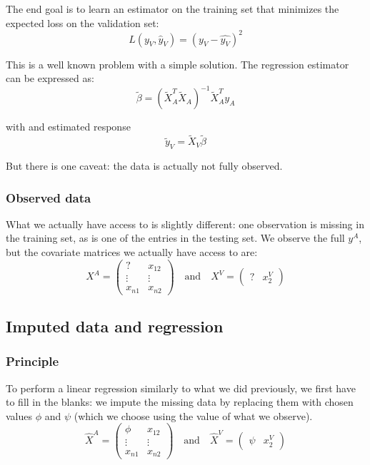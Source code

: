 \documentclass[12pt, a4paper]{memoir}
\begin{document}
The end goal is to learn an estimator on the training set that minimizes the expected loss on the validation set:
$$
L(y_V, \hat{y}_V) = (y_V - \hat{y_V})^2
$$

This is a well known problem with a simple solution. The regression estimator can be expressed as:
$$ \tilde{\beta} = (\tilde{X}_A^T \tilde{X}_A)^{-1} \tilde{X}_A^T y_A $$

with and estimated response
$$ \tilde{y}_V = \tilde{X}_V \tilde{\beta} $$

But there is one caveat: the data is actually not fully observed.

			\subsubsection{Observed data}
What we actually have access to is slightly different: one observation is missing in the training set, as is one of the entries in the testing set. We observe the full $y^A$, but the covariate matrices we actually have access to are:
\begin{equation*}
X^A = 
\begin{pmatrix}
? & x_{12} \\
\vdots & \vdots \\
x_{n1} & x_{n2}
\end{pmatrix}
\quad \mathrm{and} \quad
X^V = 
\begin{pmatrix}
? & x_{2}^V
\end{pmatrix}
\end{equation*}

		\subsection{Imputed data and regression}
			\subsubsection{Principle}
To perform a linear regression similarly to what we did previously, we first have to fill in the blanks: we impute the missing data by replacing them with chosen values $\phi$ and $\psi$ (which we choose using the value of what we observe).
\begin{equation*}
\hat{X}^A = 
\begin{pmatrix}
\phi & x_{12} \\
\vdots & \vdots \\
x_{n1} & x_{n2}
\end{pmatrix}
\quad \mathrm{and} \quad
\hat{X}^V = 
\begin{pmatrix}
\psi & x_{2}^V
\end{pmatrix}
\end{equation*}
\end{document}
